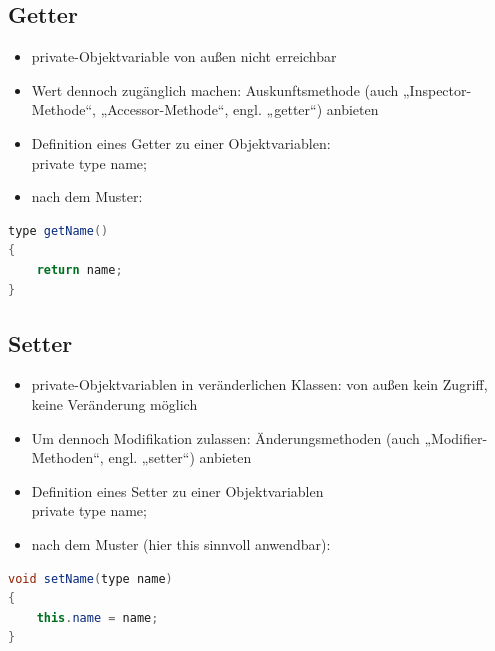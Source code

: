\subsection{Getter}
\begin{itemize}
\item private-Objektvariable von außen nicht erreichbar
\item  Wert dennoch zugänglich machen: Auskunftsmethode (auch „Inspector-Methode“, „Accessor-Methode“, engl. „getter“) anbieten
\item Definition eines Getter zu einer Objektvariablen:\\
private type name;
\item nach dem Muster:
\end{itemize}
\begin{lstlisting}[language=JAVA]
type getName()
{
	return name;
}
\end{lstlisting}

\subsection{Setter}
\begin{itemize}
\item private-Objektvariablen in veränderlichen Klassen: von außen kein Zugriff, keine Veränderung möglich
\item Um dennoch Modifikation zulassen: Änderungsmethoden (auch „Modifier-Methoden“, engl. „setter“) anbieten
\item Definition eines Setter zu einer Objektvariablen \\
private type name;
\item nach dem Muster (hier this sinnvoll anwendbar):
\end{itemize}
\begin{lstlisting}[language=JAVA]
void setName(type name)
{
	this.name = name;
}
\end{lstlisting}

